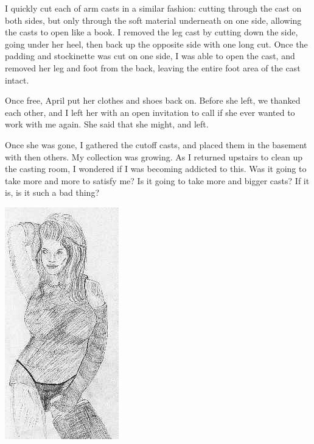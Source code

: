 I quickly cut each of arm casts in a similar fashion: cutting through the cast on both sides,
but only through the soft material underneath on one side, allowing the casts to open like a
book. I removed the leg cast by cutting down the side, going under her heel, then back up the
opposite side with one long cut. Once the padding and stockinette was cut on one side, I was
able to open the cast, and removed her leg and foot from the back, leaving the entire foot area
of the cast intact.

Once free, April put her clothes and shoes back on. Before she left, we thanked each other, and
I left her with an open invitation to call if she ever wanted to work with me again. She said
that she might, and left.

Once she was gone, I gathered the cutoff casts, and placed them in the basement with then
others. My collection was growing. As I returned upstairs to clean up the casting room, I
wondered if I was becoming addicted to this. Was it going to take more and more to satisfy me?
Is it going to take more and bigger casts? If it is, is it such a bad thing?

\begin{center}
\includegraphics{images/kicks07.jpg}
\end{center}
